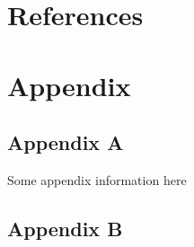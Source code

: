 \documentclass[11pt,preprint, authoryear]{elsarticle}
\numberwithin{equation}{section}
\numberwithin{figure}{section}
\numberwithin{table}{section}
\newlength{\cslhangindent}
\newenvironment{CSLReferences}%
  {\setlength{\parindent}{0pt}%
  \everypar{\setlength{\hangindent}{\cslhangindent}}\ignorespaces}%
  {\par}
\begin{document}
\newpage

\hypertarget{references}{%
\section*{References}\label{references}}

\hypertarget{refs}{}
\begin{CSLReferences}{0}{0}
\end{CSLReferences}

\hypertarget{appendix}{%
\section*{Appendix}\label{appendix}}

\hypertarget{appendix-a}{%
\subsection*{Appendix A}\label{appendix-a}}

Some appendix information here

\hypertarget{appendix-b}{%
\subsection*{Appendix B}\label{appendix-b}}


\end{document}
